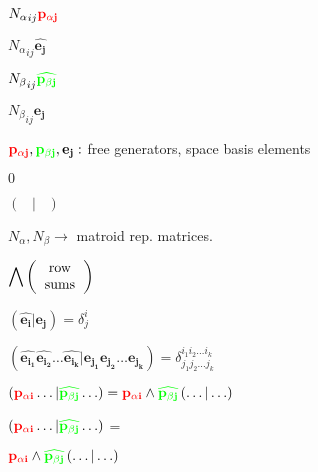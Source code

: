 \documentclass{beamer}
\begin{document}
\begin{frame}


  \( \displaystyle  {N_\alpha}_{i j} {\color{red}\mathbf{p_{\alpha j}}} \)

  \( \displaystyle  {N_\alpha}_{i j} \mathbf{\widehat{e_j}} \)

  \( \displaystyle  {N_\beta}_{i j} {\color{green}\mathbf{\widehat{p_{\beta j}}}} \)

  \( \displaystyle  {N_\beta}_{i j} \mathbf{e_j} \)

  { $\displaystyle {\color{red}\mathbf{p_{\alpha j}}},
    {\color{green}\mathbf{p_{\beta j}}}, \mathbf{e_j}:$ free generators, space basis elements }

  { \( \displaystyle 0 \) }

  \( \displaystyle \left( \;\;\; | \;\;\; \right) \)

  

 { $N_\alpha,N_\beta \rightarrow$ matroid rep. matrices. }



{ \( \displaystyle \bigwedge\left(
 \text{\begin{tabular}{c} row \\ sums 
 \end{tabular}} \right) \) }


 
{ \( \left( \mathbf{\widehat{e_i}} | \mathbf{e_j} \right) 
  = \delta^i_j \) }



{ \( \left( \mathbf{\widehat{e_{i_1}}\widehat{e_{i_2}}\ldots\widehat{e_{i_k}}} |
             \mathbf{e_{j_1}e_{j_2}\ldots e_{j_k}} \right) 
             = \delta^{i_1 i_2 \ldots i_k}_{j_1 j_2 \ldots j_k} \) }


{ \(
  \left(
       {\color{red}\mathbf{p_{\alpha i}}}  \ldots
       |
       {\color{green}\mathbf{\widehat{p_{\beta j}}}}  \ldots
  \right) 
  =
  { \color{red}\mathbf{p_{\alpha i }}}
  \wedge 
  {\color{green}\mathbf{\widehat{p_{\beta j}}}}
  \left( \ldots | \ldots \right)
  \)
}

 { \(
  \left(
       {\color{red}\mathbf{p_{\alpha i}}}  \ldots
       |
       {\color{green}\mathbf{\widehat{p_{\beta j}}}}  \ldots
  \right) 
  \) =
  }

{ \(
  { \color{red}\mathbf{p_{\alpha i}}}
  \wedge 
  {\color{green}\mathbf{\widehat{p_{\beta j}}}}
  \left( \ldots | \ldots \right)
  \)
}

\end{frame}
\end{document}
